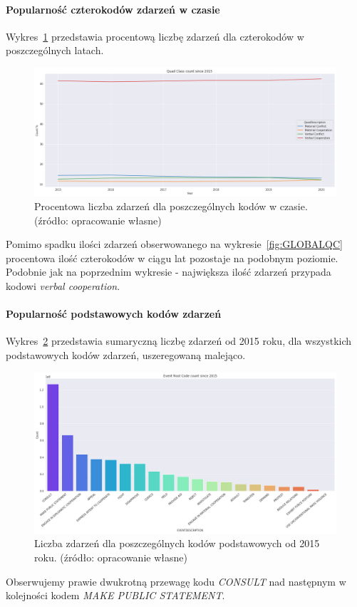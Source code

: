 \documentclass[11pt]{report}
\begin{document}
    \paragraph{Popularność czterokodów zdarzeń w czasie}
    Wykres~\ref{fig:GLOBALQCperc} przedstawia procentową liczbę zdarzeń dla czterokodów w poszczególnych latach.
    \begin{figure}[!htp]
        \centering
        \includegraphics[width=\linewidth]{fig/GLOBAL/QCperc.png}
        \caption{Procentowa liczba zdarzeń dla poszczególnych kodów w czasie. (źródło: opracowanie własne)}
        \label{fig:GLOBALQCperc}
    \end{figure}
    Pomimo spadku ilości zdarzeń obserwowanego na wykresie~\ref{fig:GLOBALQC} procentowa ilość czterokodów w ciągu lat pozostaje na podobnym poziomie.
    Podobnie jak na poprzednim wykresie - największa ilość zdarzeń przypada kodowi \textit{verbal cooperation}.

    \paragraph{Popularność podstawowych kodów zdarzeń}
    Wykres~\ref{fig:GLOBALERC} przedstawia sumaryczną liczbę zdarzeń od 2015 roku, dla wszystkich podstawowych kodów zdarzeń, uszeregowaną malejąco.
    \begin{figure}[!htp]
        \centering
        \includegraphics[width=\linewidth]{fig/GLOBAL/ERC.png}
        \caption{Liczba zdarzeń dla poszczególnych kodów podstawowych od 2015 roku. (źródło: opracowanie własne)}
        \label{fig:GLOBALERC}
    \end{figure}
    Obserwujemy prawie dwukrotną przewagę kodu \textit{CONSULT} nad następnym w kolejności kodem \textit{MAKE PUBLIC STATEMENT}.
\end{document}
